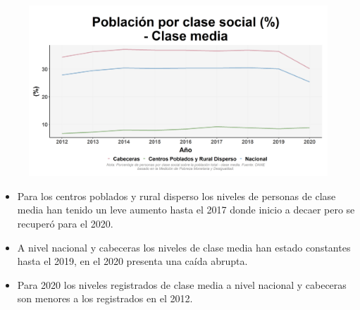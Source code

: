    \begin{figure}[H]
        \caption[Población por clase social - Clase media por zonas ]{\label{clase_media_zonas} }
        \begin{center}
        \includegraphics[width=\textwidth,keepaspectratio]{img/var_249_trend.png}
        \end{center}
    \end{figure}
            \begin{itemize}
                    \item Para los centros poblados y rural disperso los niveles de personas de clase media han tenido un leve aumento hasta el 2017 donde inicio a decaer pero se recuperó para el 2020.
                    \item A nivel nacional y cabeceras los niveles de clase media han estado constantes hasta el 2019, en el 2020 presenta una caída abrupta.
                    \item Para 2020 los niveles registrados de clase media a nivel nacional y cabeceras son menores a los registrados en el 2012.
                    \end{itemize}

